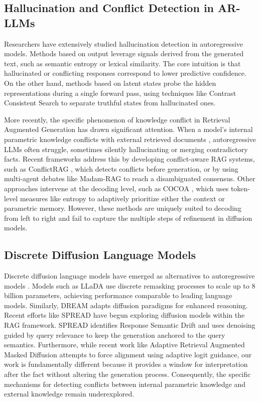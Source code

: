 \documentclass[11pt]{article}
\begin{document}
\subsection{Hallucination and Conflict Detection in AR-LLMs}
Researchers have extensively studied hallucination detection in autoregressive models. Methods based on output leverage signals derived from the generated text, such as semantic entropy \citep{kuhn2023semantic} or lexical similarity. The core intuition is that hallucinated or conflicting responses correspond to lower predictive confidence. On the other hand, methods based on latent states probe the hidden representations during a single forward pass, using techniques like Contrast Consistent Search \citep{burns2022discovering} to separate truthful states from hallucinated ones.

More recently, the specific phenomenon of knowledge conflict in Retrieval Augmented Generation has drawn significant attention. When a model's internal parametric knowledge conflicts with external retrieved documents \citep{mallen2023entity}, autoregressive LLMs often struggle, sometimes silently hallucinating or merging contradictory facts. Recent frameworks address this by developing conflict-aware RAG systems, such as ConflictRAG \citep{wang2026conflictrag}, which detects conflicts before generation, or by using multi-agent debates like Madam-RAG \citep{wang2025retrieval} to reach a disambiguated consensus. Other approaches intervene at the decoding level, such as COCOA \citep{khandelwal2025cocoa}, which uses token-level measures like entropy to adaptively prioritize either the context or parametric memory. However, these methods are uniquely suited to decoding from left to right and fail to capture the multiple steps of refinement in diffusion models.

\subsection{Discrete Diffusion Language Models}
Discrete diffusion language models have emerged as alternatives to autoregressive models \citep{sahoo2024simple, shi2024simplified}. Models such as LLaDA \citep{nie2024llada} use discrete remasking processes to scale up to 8 billion parameters, achieving performance comparable to leading language models. Similarly, DREAM \citep{zheng2024dream} adapts diffusion paradigms for enhanced reasoning. Recent efforts like SPREAD \citep{spread2026} have begun exploring diffusion models within the RAG framework. SPREAD identifies Response Semantic Drift and uses denoising guided by query relevance to keep the generation anchored to the query semantics. Furthermore, while recent work like Adaptive Retrieval Augmented Masked Diffusion \citep{aram2026} attempts to force alignment using adaptive logit guidance, our work is fundamentally different because it provides a window for interpretation after the fact without altering the generation process. Consequently, the specific mechanisms for detecting conflicts between internal parametric knowledge and external knowledge remain underexplored.
\end{document}
